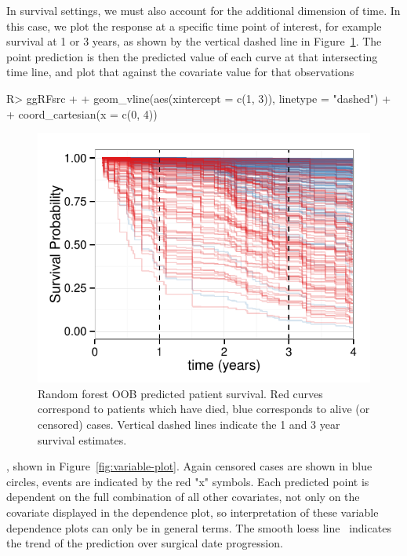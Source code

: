 \documentclass[nojss]{jss}\usepackage[]{graphicx}\usepackage[]{color}
\makeatletter
\def\maxwidth{ %
  \ifdim\Gin@nat@width>\linewidth
    \linewidth
  \else
    \Gin@nat@width
  \fi
}
\makeatother
\begin{document}
In survival settings, we must also account for the additional dimension of time. In this case, we plot the response at a specific time point of interest, for example survival at 1 or 3 years, as shown by the vertical dashed line in Figure~\ref{fig:rfsrc-plot3Mnth}. The point prediction is then the predicted value of each curve at that intersecting time line, and plot that against the covariate value for that observations
\begin{Schunk}
\begin{Sinput}
R> ggRFsrc + 
+   geom_vline(aes(xintercept = c(1, 3)), linetype = "dashed") + 
+   coord_cartesian(x = c(0, 4))
\end{Sinput}
\begin{figure}[!htpb]

{\centering \includegraphics[width=\maxwidth]{figure/rfs-rfsrc-plot3Mnth-1} 

}

\caption[Random forest OOB predicted patient survival]{Random forest OOB predicted patient survival. Red curves correspond to patients which have died, blue corresponds to alive (or censored) cases. Vertical dashed lines indicate the 1 and 3 year survival estimates.\label{fig:rfsrc-plot3Mnth}}
\end{figure}
\end{Schunk}

, shown in Figure~\ref{fig:variable-plot}. Again censored cases are shown in blue circles, events are indicated by the red "x" symbols. Each predicted point is dependent on the full combination of all other covariates, not only on the covariate displayed in the dependence plot, so interpretation of these variable dependence plots can only be in general terms. The smooth loess line~\citep{cleveland:1981, cleveland:1988} indicates the trend of the prediction over surgical date progression.
\end{document}
